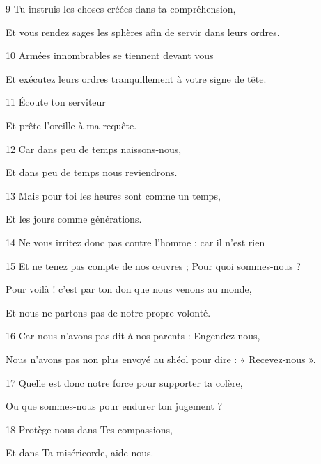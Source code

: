 \par 9 Tu instruis les choses créées dans ta compréhension,

\par Et vous rendez sages les sphères afin de servir dans leurs ordres.

\par 10 Armées innombrables se tiennent devant vous

\par Et exécutez leurs ordres tranquillement à votre signe de tête.

\par 11 Écoute ton serviteur

\par Et prête l'oreille à ma requête.

\par 12 Car dans peu de temps naissons-nous,

\par Et dans peu de temps nous reviendrons.

\par 13 Mais pour toi les heures sont comme un temps,

\par Et les jours comme générations.

\par 14 Ne vous irritez donc pas contre l'homme ; car il n'est rien

\par 15 Et ne tenez pas compte de nos œuvres ; Pour quoi sommes-nous ?

\par Pour voilà ! c'est par ton don que nous venons au monde,

\par Et nous ne partons pas de notre propre volonté.

\par 16 Car nous n'avons pas dit à nos parents : Engendez-nous,

\par Nous n'avons pas non plus envoyé au shéol pour dire : « Recevez-nous ».

\par 17 Quelle est donc notre force pour supporter ta colère,

\par Ou que sommes-nous pour endurer ton jugement ?

\par 18 Protège-nous dans Tes compassions,

\par Et dans Ta miséricorde, aide-nous.

